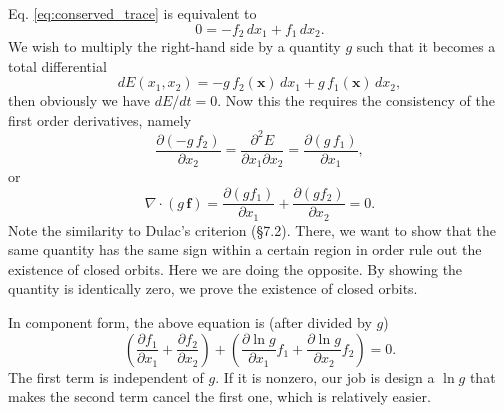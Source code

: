 \documentclass{book}
\begin{document}
Eq. \eqref{eq:conserved_trace} is equivalent to
$$
0 =
-f_2 \, d x_1
+f_1 \, d x_2.
$$
We wish to multiply the right-hand side by a quantity $g$
such that it becomes a total differential
$$
dE(x_1, x_2)
=
-g \, f_2(\mathbf x) \, d x_1
+g \, f_1(\mathbf x) \, d x_2,
$$
then obviously we have $dE/dt = 0$.
Now this the requires the consistency of the first order derivatives, namely
$$
\frac{\partial (-g \, f_2)}{\partial x_2}
=
\frac{\partial^2 E}{\partial x_1 \partial x_2}
=
\frac{\partial (g \, f_1)}{\partial x_1},
$$
or
\begin{equation}
\nabla \cdot (g \, \mathbf f)
=
\frac{\partial (g f_1)}{\partial x_1}
+\frac{\partial (g f_2)}{\partial x_2}
= 0.
\label{eq:divgf_eq_0}
\end{equation}
Note the similarity to Dulac's criterion (\S 7.2).
There, we want to show that the same quantity has the same sign within a certain region in order rule out the existence of closed orbits.
Here we are doing the opposite.
By showing the quantity is identically zero, we prove the existence of closed orbits.

In component form, the above equation is (after divided by $g$)
\begin{equation}
\left( \frac{\partial f_1}{\partial x_1}
+\frac{\partial f_2}{\partial x_2} \right)
+\left(
\frac{\partial \ln g }{\partial x_1} f_1
+\frac{\partial \ln g }{\partial x_2} f_2
\right)
=0.
\label{eq:divfdivlng}
\end{equation}
The first term is independent of $g$.
If it is nonzero, our job is design a $\ln g$
that makes the second term cancel the first one,
which is relatively easier.
\end{document}
